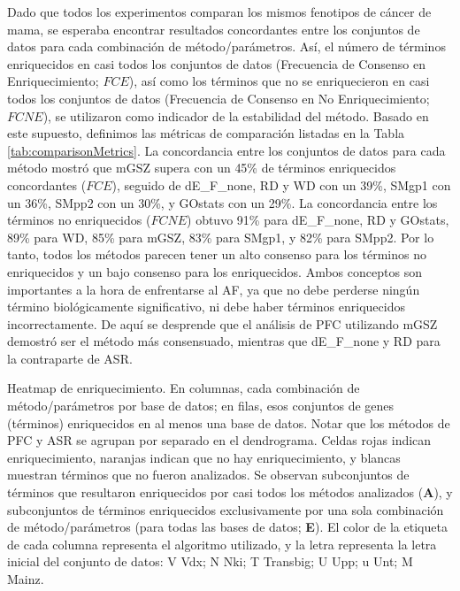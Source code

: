 \documentclass[12pt,twoside]{reedthesis}
\begin{document}
Dado que todos los experimentos comparan los mismos fenotipos de cáncer de mama, se esperaba encontrar resultados concordantes entre los conjuntos de datos para cada combinación de método/parámetros. Así, el número de términos enriquecidos en casi todos los conjuntos de datos (Frecuencia de Consenso en Enriquecimiento; \(FCE\)), así como los términos que no se enriquecieron en casi todos los conjuntos de datos (Frecuencia de Consenso en No Enriquecimiento; \(FCNE\)), se utilizaron como indicador de la estabilidad del método. Basado en este supuesto, definimos las métricas de comparación listadas en la Tabla \ref{tab:comparisonMetrics}. La concordancia entre los conjuntos de datos para cada método mostró que mGSZ supera con un 45\% de términos enriquecidos concordantes (\(FCE\)), seguido de dE\_F\_none, RD y WD con un 39\%, SMgp1 con un 36\%, SMpp2 con un 30\%, y GOstats con un 29\%. La concordancia entre los términos no enriquecidos (\(FCNE\)) obtuvo 91\% para dE\_F\_none, RD y GOstats, 89\% para WD, 85\% para mGSZ, 83\% para SMgp1, y 82\% para SMpp2. Por lo tanto, todos los métodos parecen tener un alto consenso para los términos no enriquecidos y un bajo consenso para los enriquecidos. Ambos conceptos son importantes a la hora de enfrentarse al AF, ya que no debe perderse ningún término biológicamente significativo, ni debe haber términos enriquecidos incorrectamente. De aquí se desprende que el análisis de PFC utilizando mGSZ demostró ser el método más consensuado, mientras que dE\_F\_none y RD para la contraparte de ASR.

Heatmap de enriquecimiento. En columnas, cada combinación de método/parámetros por base de datos; en filas, esos conjuntos de genes (términos) enriquecidos en al menos una base de datos. Notar que los métodos de PFC y ASR se agrupan por separado en el dendrograma. Celdas rojas indican enriquecimiento, naranjas indican que no hay enriquecimiento, y blancas muestran términos que no fueron analizados. Se observan subconjuntos de términos que resultaron enriquecidos por casi todos los métodos analizados (\textbf{A}), y subconjuntos de términos enriquecidos exclusivamente por una sola combinación de método/parámetros (para todas las bases de datos; \textbf{E}). El color de la etiqueta de cada columna representa el algoritmo utilizado, y la letra representa la letra inicial del conjunto de datos: V Vdx; N Nki; T Transbig; U Upp; u Unt; M Mainz.
\end{document}
